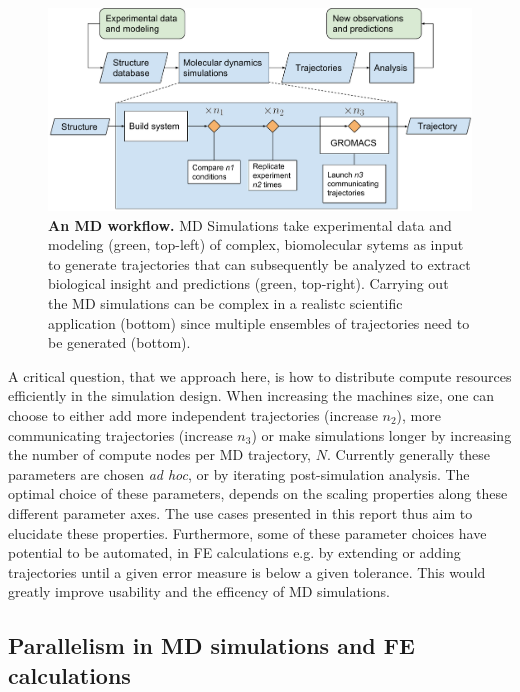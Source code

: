\documentclass[11pt,a4paper]{article}
\begin{document}
\begin{figure}[thbp!]
\includegraphics[width=1\textwidth]{figs/md-workflow.pdf}
\caption{\label{fig:mdworkflow}
\textbf{An MD workflow.} 
MD Simulations take experimental data and modeling (green, top-left) of complex, biomolecular sytems as input to generate trajectories that can subsequently be analyzed to extract biological insight and predictions (green, top-right). Carrying out the MD simulations can be complex in a realistc scientific application (bottom) since multiple ensembles of trajectories need to be generated (bottom). 
}
\end{figure}

A critical question, that we approach here, is how to distribute compute resources efficiently in the simulation design. 
When increasing the machines size, one can choose to either add more independent trajectories (increase $n_2$), more communicating trajectories (increase $n_3$) or make simulations longer by increasing the number of compute nodes per MD trajectory,  $N$. Currently generally these parameters are chosen \textit{ad hoc}, or by iterating  post-simulation analysis.
The optimal choice of these parameters, depends on the scaling properties along these different parameter axes. The use cases presented in this report thus aim to  elucidate these properties.
Furthermore, some of these parameter choices have potential to be automated, in FE calculations e.g. by extending or adding trajectories until a given error measure is below a given tolerance. This would greatly improve usability and the efficency of MD simulations. 


\subsection{Parallelism in MD simulations and FE calculations}
\end{document}
